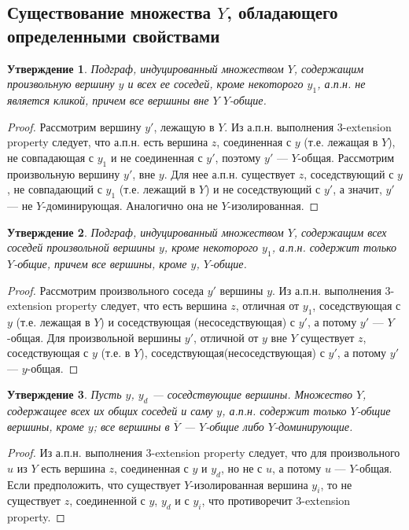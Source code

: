\documentclass{article}
\newtheorem*{sttm}{Утверждение}
\begin{document}
	\subsection{Существование множества $Y$, обладающего определенными свойствами}
	
	\begin{sttm}
		Подграф, индуцированный множеством $Y$, содержащим произвольную вершину $y$ и всех ее соседей, кроме некоторого $y_1$, а.п.н. не является кликой, причем все вершины вне $Y$ $Y$-общие.
	\end{sttm}
	
	\begin{proof}
		Рассмотрим вершину $y'$, лежащую в $Y$. Из а.п.н. выполнения  3-extension property следует, что а.п.н. есть вершина $z$, соединенная с $y$ (т.е. лежащая в $Y$), не совпадающая с $y_1$ и не соединенная с $y'$, поэтому $y'$ --- $Y$-общая. Рассмотрим произвольную вершину $y'$, вне $y$. Для нее а.п.н. существует $z$, соседствующий с $y$, не совпадающий с $y_1$ (т.е. лежащий в $Y$) и не соседствующий с $y'$, а значит, $y'$ --- не $Y$-доминирующая. Аналогично она не $Y$-изолированная.
	\end{proof}
	
	\begin{sttm}
		Подграф, индуцированный множеством $Y$, содержащим всех соседей произвольной вершины $y$, кроме некоторого $y_1$, а.п.н. содержит только $Y$-общие, причем все вершины, кроме $y$, $Y$-общие.
	\end{sttm}
	
	\begin{proof}
		Рассмотрим произвольного соседа $y'$ вершины $y$. Из а.п.н. выполнения 3-extension property следует, что есть вершина $z$, отличная от $y_1$, соседствующая с $y$ (т.е. лежащая в $Y$) и соседствующая (несоседствующая) с $y'$, а потому $y'$ --- $Y$-общая. Для произвольной вершины $y'$, отличной от $y$ вне $Y$ существует $z$, соседствующая с $y$ (т.е. в $Y$), соседствующая(несоседствующая) с $y'$, а потому $y'$ --- $y$-общая.
	\end{proof}	
	
	
	\begin{sttm}
		Пусть $y$, $y_d$ --- соседствующие вершины. Множество $Y$, содержащее всех их общих соседей и саму $y$, а.п.н. содержит только $Y$-общие вершины, кроме $y$; все вершины в $\overline{Y}$ --- $Y$-общие либо $Y$-доминирующие.
	\end{sttm}
	
	\begin{proof}
		Из а.п.н. выполнения 3-extension property следует, что для произвольного $u$ из $Y$ есть вершина $z$, соединенная с $y$ и $y_d$, но не с $u$, а потому $u$ --- $Y$-общая. Если предположить, что существует $Y$-изолированная вершина $y_i$, то не существует $z$,  соединенной с $y$, $y_d$ и с $y_i$, что противоречит 3-extension property.
	\end{proof}	
	
\end{document}
